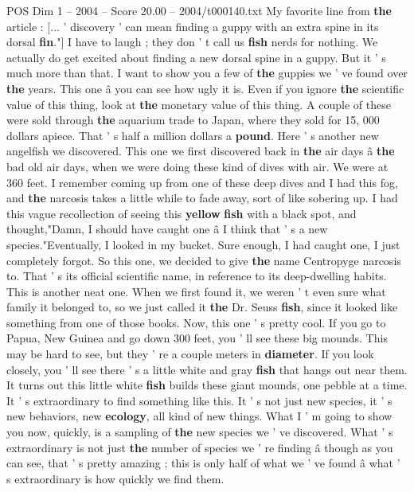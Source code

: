 \begin{textsample}{POS Dim 1 – 2004 – Score 20.00 – 2004/t000140.txt}
My favorite line from \textbf{the} article : [... ' discovery ' can mean finding a guppy with an extra spine in its dorsal \textbf{fin}."] I have to laugh ; they don ' t call us \textbf{fish} nerds for nothing.
We actually do get excited about finding a new dorsal spine in a guppy.
But it ' s much more than that.
I want to show you a few of \textbf{the} guppies we ' ve found over \textbf{the} years.
This one â you can see how ugly it is.
Even if you ignore \textbf{the} scientific value of this thing, look at \textbf{the} monetary value of this thing.
A couple of these were sold through \textbf{the} aquarium trade to Japan, where they sold for 15, 000 dollars apiece.
That ' s half a million dollars a \textbf{pound}.
Here ' s another new angelfish we discovered.
This one we first discovered back in \textbf{the} air days â \textbf{the} bad old air days, when we were doing these kind of dives with air.
We were at 360 feet.
I remember coming up from one of these deep dives and I had this fog, and \textbf{the} narcosis takes a little while to fade away, sort of like sobering up.
I had this vague recollection of seeing this \textbf{yellow} \textbf{fish} with a black spot, and thought,"Damn, I should have caught one â I think that ' s a new species."Eventually, I looked in my bucket.
Sure enough, I had caught one, I just completely forgot.
So this one, we decided to give \textbf{the} name Centropyge narcosis to.
That ' s its official scientific name, in reference to its deep-dwelling habits.
This is another neat one.
When we first found it, we weren ' t even sure what family it belonged to, so we just called it \textbf{the} Dr.
Seuss \textbf{fish}, since it looked like something from one of those books.
Now, this one ' s pretty cool.
If you go to Papua, New Guinea and go down 300 feet, you ' ll see these big mounds.
This may be hard to see, but they ' re a couple meters in \textbf{diameter}.
If you look closely, you ' ll see there ' s a little white and gray \textbf{fish} that hangs out near them.
It turns out this little white \textbf{fish} builds these giant mounds, one pebble at a time.
It ' s extraordinary to find something like this.
It ' s not just new species, it ' s new behaviors, new \textbf{ecology}, all kind of new things.
What I ' m going to show you now, quickly, is a sampling of \textbf{the} new species we ' ve discovered.
What ' s extraordinary is not just \textbf{the} number of species we ' re finding â though as you can see, that ' s pretty amazing ; this is only half of what we ' ve found â what ' s extraordinary is how quickly we find them.

\end{textsample}
